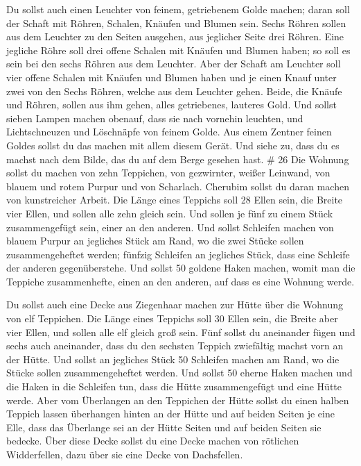  Du sollst auch einen Leuchter von feinem, getriebenem
Golde machen; daran soll der Schaft mit Röhren, Schalen, Knäufen und
Blumen sein.  Sechs Röhren sollen aus dem Leuchter zu den
Seiten ausgehen, aus jeglicher Seite drei Röhren.  Eine
jegliche Röhre soll drei offene Schalen mit Knäufen und Blumen haben; so
soll es sein bei den sechs Röhren aus dem Leuchter.  Aber
der Schaft am Leuchter soll vier offene Schalen mit Knäufen und Blumen
haben  und je einen Knauf unter zwei von den Sechs Röhren,
welche aus dem Leuchter gehen.  Beide, die Knäufe und
Röhren, sollen aus ihm gehen, alles getriebenes, lauteres Gold.
 Und sollst sieben Lampen machen obenauf, dass sie nach
vornehin leuchten,  und Lichtschneuzen und Löschnäpfe von
feinem Golde.  Aus einem Zentner feinen Goldes sollst du
das machen mit allem diesem Gerät.  Und siehe zu, dass du
es machst nach dem Bilde, das du auf dem Berge gesehen hast. \# 26
 Die Wohnung sollst du machen von zehn Teppichen, von
gezwirnter, weißer Leinwand, von blauem und rotem Purpur und von
Scharlach. Cherubim sollst du daran machen von kunstreicher Arbeit.
 Die Länge eines Teppichs soll 28 Ellen sein, die Breite
vier Ellen, und sollen alle zehn gleich sein.  Und sollen je
fünf zu einem Stück zusammengefügt sein, einer an den anderen.
 Und sollst Schleifen machen von blauem Purpur an jegliches
Stück am Rand, wo die zwei Stücke sollen zusammengeheftet werden;
 fünfzig Schleifen an jegliches Stück, dass eine Schleife
der anderen gegenüberstehe.  Und sollst 50 goldene Haken
machen, womit man die Teppiche zusammenhefte, einen an den anderen, auf
dass es eine Wohnung werde.

 Du sollst auch eine Decke aus Ziegenhaar machen zur Hütte
über die Wohnung von elf Teppichen.  Die Länge eines
Teppichs soll 30 Ellen sein, die Breite aber vier Ellen, und sollen alle
elf gleich groß sein.  Fünf sollst du aneinander fügen und
sechs auch aneinander, dass du den sechsten Teppich zwiefältig machst
vorn an der Hütte.  Und sollst an jegliches Stück 50
Schleifen machen am Rand, wo die Stücke sollen zusammengeheftet werden.
 Und sollst 50 eherne Haken machen und die Haken in die
Schleifen tun, dass die Hütte zusammengefügt und eine Hütte werde.
 Aber vom Überlangen an den Teppichen der Hütte sollst du
einen halben Teppich lassen überhangen hinten an der Hütte 
und auf beiden Seiten je eine Elle, dass das Überlange sei an der Hütte
Seiten und auf beiden Seiten sie bedecke.  Über diese Decke
sollst du eine Decke machen von rötlichen Widderfellen, dazu über sie
eine Decke von Dachsfellen.

